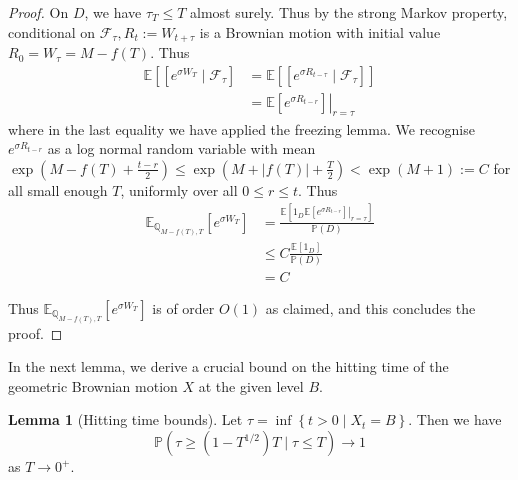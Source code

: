 \documentclass{article}
\theoremstyle{definition}
\newtheorem{lemma}[theorem]{Lemma}
\theoremstyle{definition}
\begin{document}
\begin{proof}
On $D$, we have $\tau_{T} \leq T$ almost surely. Thus by the strong Markov property, conditional on $\mathcal{F}_{\tau}, R_{t}:=W_{t+\tau}$ is a Brownian motion with initial value $R_{0}=W_{\tau}=M-f(T)$. Thus
$$
\begin{aligned}
\mathbb{E}\left[\left[e^{\sigma W_{T}} \mid \mathcal{F}_{\tau}\right]\right. & =\mathbb{E}\left[\left[e^{\sigma R_{t-\tau}} \mid \mathcal{F}_{\tau}\right]\right] \\
& =\left.\mathbb{E}\left[e^{\sigma R_{t-r}}\right]\right|_{r=\tau}
\end{aligned}
$$
where in the last equality we have applied the freezing lemma. We recognise $e^{\sigma R_{t-r}}$ as a log normal random variable with mean $\exp \left(M-f(T)+\frac{t-r}{2}\right) \leq \exp \left(M+|f(T)|+\frac{T}{2}\right)<\exp (M+1):=C$ for all small enough $T$, uniformly over all $0 \leq r \leq t$. Thus
$$
\begin{aligned}
\mathbb{E}_{\mathbb{Q}_{M-f(T), T}}\left[e^{\sigma W_{T}}\right] & =\frac{\mathbb{E}\left[\left.1_{D} \mathbb{E}\left[e^{\sigma R_{t-r}}\right]\right|_{r=\tau}\right]}{\mathbb{P}(D)} \\
& \leq C \frac{\mathbb{E}\left[1_{D}\right]}{\mathbb{P}(D)} \\
& =C
\end{aligned}
$$

Thus $\mathbb{E}_{\mathbb{Q}_{M-f(T), T}}\left[e^{\sigma W_{T}}\right]$ is of order $O(1)$ as claimed, and this concludes the proof.
\end{proof}
In the next lemma, we derive a crucial bound on the hitting time of the geometric Brownian motion $X$ at the given level $B$.

\begin{lemma}[Hitting time bounds] Let $\tau=\inf \left\{t>0 \mid X_{t}=B\right\}$. Then we have
$$
\mathbb{P}\left(\tau \geq\left(1-T^{1 / 2}\right) T \mid \tau \leq T\right) \rightarrow 1
$$
as $T \rightarrow 0^{+}$.
\end{lemma}
\end{document}
